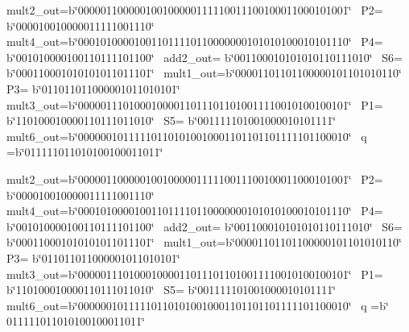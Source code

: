 mult2\+\_\+out=b\char`\"{}000001100000100100000111110011100100011000101001\char`\"{}~\newline
 P2= b\char`\"{}000010010000011111001110\char`\"{}~\newline
 mult4\+\_\+out=b\char`\"{}000101000010011011110110000000101010100010101110\char`\"{}~\newline
 P4= b\char`\"{}001010000100110111101100\char`\"{}~\newline
 add2\+\_\+out= b\char`\"{}001100010101010110111010\char`\"{}~\newline
 S6= b\char`\"{}000110001010101011011101\char`\"{}~\newline
 mult1\+\_\+out=b\char`\"{}00001101101100000101101010110\char`\"{}~\newline
 P3= b\char`\"{}011011011000001011010101\char`\"{}~\newline
 mult3\+\_\+out=b\char`\"{}000001110100010000110111011010011110010100100101\char`\"{}~\newline
 P1= b\char`\"{}110100010000110111011010\char`\"{}~\newline
 S5= b\char`\"{}001111101001000010101111\char`\"{}~\newline
 mult6\+\_\+out=b\char`\"{}000000101111101101010010001101101101111101100010\char`\"{}~\newline
 q =b\char`\"{}011111011010100100011011\char`\"{}  

mult2\+\_\+out=b\char`\"{}000001100000100100000111110011100100011000101001\char`\"{}~\newline
 P2= b\char`\"{}000010010000011111001110\char`\"{}~\newline
 mult4\+\_\+out=b\char`\"{}000101000010011011110110000000101010100010101110\char`\"{}~\newline
 P4= b\char`\"{}001010000100110111101100\char`\"{}~\newline
 add2\+\_\+out= b\char`\"{}001100010101010110111010\char`\"{}~\newline
 S6= b\char`\"{}000110001010101011011101\char`\"{}~\newline
 mult1\+\_\+out=b\char`\"{}00001101101100000101101010110\char`\"{}~\newline
 P3= b\char`\"{}011011011000001011010101\char`\"{}~\newline
 mult3\+\_\+out=b\char`\"{}000001110100010000110111011010011110010100100101\char`\"{}~\newline
 P1= b\char`\"{}110100010000110111011010\char`\"{}~\newline
 S5= b\char`\"{}001111101001000010101111\char`\"{}~\newline
 mult6\+\_\+out=b\char`\"{}000000101111101101010010001101101101111101100010\char`\"{}~\newline
 q =b\char`\"{}       011111011010100100011011\char`\"{}  

